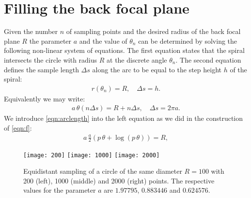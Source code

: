 \documentclass[twocolumn,DIV18]{scrartcl}
\renewcommand{\(}{\left(}
\renewcommand{\)}{\right)}
\begin{document}
\section{Filling the back focal plane}
Given the number $n$ of sampling points and the desired radius of the
back focal plane $R$ the parameter $a$ and the value of $\theta_n$ can
be determined by solving the following non-linear system of
equations. The first equation states that the spiral intersects the
circle with radius $R$ at the discrete angle $\theta_n$. The second
equation defines the sample length $\Delta s$ along the arc to be
equal to the step height $h$ of the spiral:
\begin{align}
  r(\theta_n)=R, \quad \Delta s=h.
\end{align}
Equivalently we may write:
\begin{align}
  a \, \theta(n \Delta s)=R+n\Delta s, \quad \Delta s=2\pi a.
\end{align}
We introduce \eqref{eqn:arclength} into the left equation as we did in
the construction of \eqref{eqn:f}:
\begin{align}
  a \, \frac{a}{2} \(p\,\theta+\log(p\,\theta)\) = R, 
\end{align}
\begin{figure}[h]
  \begin{center}
    \texttt{[image: 200]}
    \texttt{[image: 1000]}
    \texttt{[image: 2000]}
  \end{center}
  \caption{Equidistant sampling of a circle of the same diameter
    $R=100$ with 200 (left), 1000 (middle) and 2000 (right)
    points. The respective values for the parameter $a$ are $1.97795$,
    $0.883446$ and $0.624576$. }
\end{figure}
\end{document}
